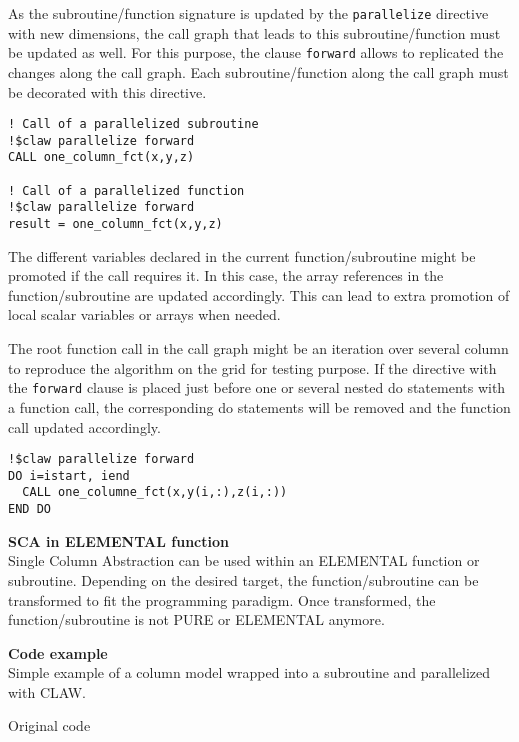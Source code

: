As the subroutine/function signature is updated by the \lstinline!parallelize!
directive with new dimensions, the call graph that leads to this
subroutine/function must be updated as well. For this purpose, the clause
\lstinline!forward! allows to replicated the changes along the call graph.
Each subroutine/function along the call graph must be decorated with this
directive.

\begin{lstlisting}
! Call of a parallelized subroutine
!$claw parallelize forward
CALL one_column_fct(x,y,z)

! Call of a parallelized function
!$claw parallelize forward
result = one_column_fct(x,y,z)
\end{lstlisting}

The different variables declared in the current function/subroutine might be
promoted if the call requires it. In this case, the array references in
the function/subroutine are updated accordingly. This can lead to extra
promotion of local scalar variables or arrays when needed.

The root function call in the call graph might be an iteration over several
column to reproduce the algorithm on the grid for testing purpose. If the
directive with the \lstinline!forward! clause is placed just before one or
several nested do statements with a function call, the corresponding do
statements will be removed and the function call updated accordingly.

\begin{lstlisting}
!$claw parallelize forward
DO i=istart, iend
  CALL one_columne_fct(x,y(i,:),z(i,:))
END DO
\end{lstlisting}

\textbf{SCA in ELEMENTAL function}\\
Single Column Abstraction can be used within an ELEMENTAL function or
subroutine. Depending on the desired target, the function/subroutine can be
transformed to fit the programming paradigm. Once transformed, the
function/subroutine is not PURE or ELEMENTAL anymore.


\textbf{Code example}\\
\label{parallelize1}
Simple example of a column model wrapped into a subroutine and parallelized with
CLAW.

Original code



